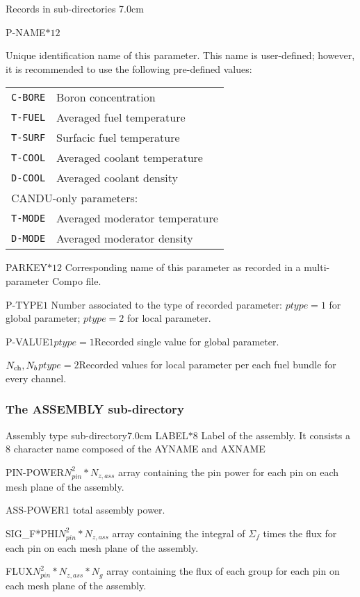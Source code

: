 \begin{DescriptionEnregistrement}{Records in  sub-directories}
{7.0cm} \label{tabl:tabparam}

\CharEnr
 {P-NAME}{$*12$} {Unique identification name of this parameter. This
 name is user-defined; however, it is recommended to use the following pre-defined
 values:

\begin{tabular}{|c|l|}
\hline
{\tt C-BORE} & Boron concentration \\
{\tt T-FUEL} & Averaged fuel temperature \\
{\tt T-SURF} & Surfacic fuel temperature \\
{\tt T-COOL} & Averaged coolant temperature \\
{\tt D-COOL} & Averaged coolant density \\
\hline
\multicolumn{2}{|l|}{CANDU-only parameters:} \\
\hline
{\tt T-MODE} & Averaged moderator temperature\\
{\tt D-MODE} & Averaged moderator density \\
\hline
\end{tabular}
 }

\CharEnr
 {PARKEY}{$*12$} {Corresponding name of this parameter as recorded
  in a multi-parameter Compo file.}

\IntEnr
 {P-TYPE}{$1$} {Number associated to the type of recorded parameter:
 $ptype=1$ for global parameter; $ptype=2$ for local parameter.}

\OptRealEnr
 {P-VALUE}{$1$}{$ptype=1$}{}{Recorded single value for global parameter.}

\OptRealEnr
  {}{$N_{\rm ch}, N_b$}{$ptype=2$}{}{Recorded values for local parameter per each fuel
  bundle for every channel.}

\end{DescriptionEnregistrement}

\subsubsection{The ASSEMBLY sub-directory}\label{sect:fmapdirass}

\begin{DescriptionEnregistrement}{Assembly type sub-directory}{7.0cm}
\CharEnr
  {LABEL}{$*8$}
  {Label of the assembly. It consists a 8 character name composed of the AYNAME and AXNAME}

\RealEnr
  {PIN-POWER}{$N_{pin}^2*N_{z,ass}$}{}
  {array containing the pin power for each pin on each mesh plane of the assembly.}

\RealEnr
  {ASS-POWER}{1}{}
  {total assembly power.}

\RealEnr
  {SIG\_F*PHI}{$N_{pin}^2*N_{z,ass}$}{}
  {array containing the integral of $\Sigma_f$  times the flux for each pin on each mesh plane of the assembly.}

\RealEnr
  {FLUX}{$N_{pin}^2*N_{z,ass}*N_g$}{}
  {array containing the flux of each group for each pin on each mesh plane of the assembly.}

 \end{DescriptionEnregistrement}

